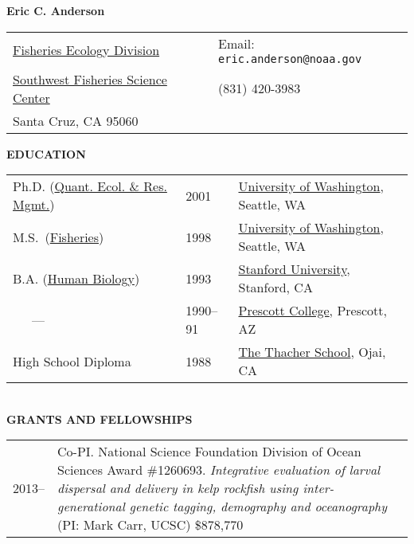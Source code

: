 \documentclass[11pt]{article}
\newlength{\myindent}
\newlength{\postskip}
\newlength{\preskip}
\newlength{\scndcol}
\begin{document}
\begin{center} \LARGE {\bf Eric C. Anderson}\\
\end{center} 
\begin{tabular*}{\textwidth}{@{\extracolsep{\fill}}ll@{}} 
\href{http://swfsc.noaa.gov/fed.aspx}{Fisheries Ecology Division}       
&
Email: \texttt{eric.anderson@noaa.gov}
\\ 
\href{http://swfsc.noaa.gov/default.aspx}{Southwest Fisheries Science Center} &         
(831) 420-3983
\\   Santa Cruz, CA  95060 
&        
  \\
\end{tabular*}
\vspace*{\postskip}
\nopagebreak

{\bf EDUCATION}
\vspace*{\preskip}\\
\begin{tabular}{@{\hspace{\myindent}}lll   }  Ph.D. (\href{http://depts.washington.edu/qerm/}{Quant. Ecol. \& Res.
Mgmt.})  &  2001   &   \href{http://www.washington.edu/}{University of Washington}, Seattle, WA
\\ M.S.~(\href{http://www.fish.washington.edu/}{Fisheries})         &    1998 & 
\href{http://www.washington.edu/}{University of Washington}, Seattle, WA
\\
B.A. (\href{http://www.stanford.edu/dept/humbio/}{Human Biology})   &  
1993 &
\href{http://www.stanford.edu/}{Stanford University}, Stanford, 
CA
\\
~~~---~~~  &  1990--91  & \href{http://www.prescott.edu/}{Prescott College}, Prescott, AZ  \\
High School Diploma  &  1988  &  \href{http://www.thacher.org/}{The Thacher School}, Ojai, CA
\end{tabular} 
\vspace*{\postskip}\\

{\bf GRANTS AND FELLOWSHIPS}
\vspace*{\preskip}\\
\begin{tabular}{ @{}p{2.5\myindent} p{\scndcol}@{}  }
\hspace*{\myindent}2013-- &  Co-PI. National Science Foundation Division of Ocean Sciences Award \#1260693. {\em Integrative evaluation of larval dispersal and delivery in kelp rockfish using inter-generational genetic tagging, demography and oceanography} (PI: Mark Carr, UCSC)    \$878,770\\
\end{tabular}
\end{document}
